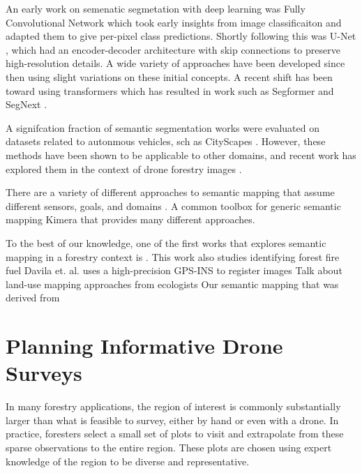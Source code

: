 An early work on semenatic segmetation with deep learning was Fully Convolutional Network \cite{Shelhamer2017FullySegmentation} which took early insights from image classificaiton and adapted them to give per-pixel class predictions. Shortly following this was U-Net \cite{RonnebergerUNET2015}, which had an encoder-decoder architecture with skip connections to preserve high-resolution details. A wide variety of approaches have been developed since then using slight variations on these initial concepts. A recent shift has been toward using transformers \cite{Vaswani2017AttentionNeed} which has resulted in work such as Segformer \cite{Xie2021} and SegNext \cite{Guo2022SegNeXt:Segmentation}.

A signifcation fraction of semantic segmentation works were evaluated on datasets related to autonmous vehicles, sch as CityScapes \cite{Cordts2016}. However, these methods have been shown to be applicable to other domains, and recent work has explored them in the context of drone forestry images \cite{Nogueira2017SemanticConvNets, Neves2020SemanticU}. 


There are a variety of different approaches to semantic mapping that assume different sensors, goals, and domains \cite{Kostavelis2015SemanticSurvey}.
A common toolbox for generic semantic mapping Kimera \cite{Rosinol2020} that provides many different approaches.

To the best of our knowledge, one of the first works that explores semantic mapping in a forestry context is \cite{Andrada2022IntegrationRoboticsb}. This work also studies identifying forest fire fuel   
Davila et. al. uses a high-precision GPS-INS to register images \cite{Davila2022ADAPT:AI}
Talk about land-use mapping approaches from ecologists \cite{Liu2018DeepClassification} 
Our semantic mapping \cite{RussellUnmannedMitigation} that was derived from \cite{semantic_slam_RGBD}



\section{Planning Informative Drone Surveys}

In many forestry applications, the region of interest is commonly substantially larger than what is feasible to survey, either by hand or even with a drone. In practice, foresters  select a small set of plots to visit and extrapolate from these sparse observations to the entire region. These plots are chosen using expert knowledge of the region to be diverse and representative.

